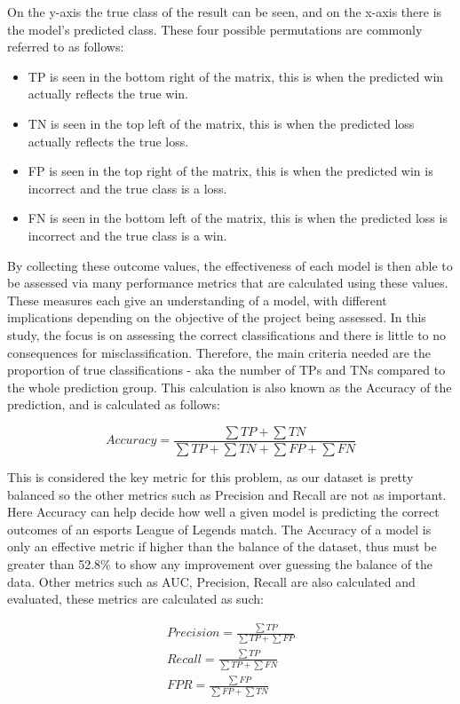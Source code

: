 On the y-axis the true class of the result can be seen, and on the x-axis there is the model's predicted class.
These four possible permutations are commonly referred to as follows:
\begin{itemize}
    \item \ac{TP} is seen in the bottom right of the matrix, this is when the predicted win actually reflects the true win.
    \item \ac{TN} is seen in the top left of the matrix, this is when the predicted loss actually reflects the true loss.
    \item \ac{FP} is seen in the top right of the matrix, this is when the predicted win is incorrect and the true class is a loss.
    \item \ac{FN} is seen in the bottom left of the matrix, this is when the predicted loss is incorrect and the true class is a win.
\end{itemize}

By collecting these outcome values, the effectiveness of each model is then able to be assessed via many performance metrics that are calculated using these values.
These measures each give an understanding of a model, with different implications depending on the objective of the project being assessed.
In this study, the focus is on assessing the correct classifications and there is little to no consequences for misclassification.
Therefore, the main criteria needed are the proportion of true classifications - aka the number of \ac{TP}s and \ac{TN}s compared to the whole prediction group.
This calculation is also known as the Accuracy of the prediction, and is calculated as follows:

\[ Accuracy = \frac{\sum TP + \sum TN}{\sum TP + \sum TN + \sum FP + \sum FN} \]

This is considered the key metric for this problem, as our dataset is pretty balanced so the other metrics such as Precision and Recall are not as important.
Here Accuracy can help decide how well a given model is predicting the correct outcomes of an esports League of Legends match.
The Accuracy of a model is only an effective metric if higher than the balance of the dataset, thus must be greater than 52.8\% to show any improvement over guessing the balance of the data.
Other metrics such as AUC, Precision, Recall are also calculated and evaluated, these metrics are calculated as such:

\begin{gather*}
    Precision = \frac{\sum TP}{\sum TP + \sum FP}\\
    Recall = \frac{\sum TP}{\sum TP + \sum FN}\\
    FPR = \frac{\sum FP}{\sum FP + \sum TN}\\
\end{gather*}

